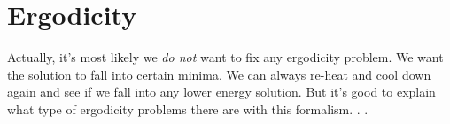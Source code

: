 \documentclass[11pt]{article}
\begin{document}
\section{Ergodicity}
Actually, it's most likely we \emph{do not} want to fix any ergodicity problem.  We want the solution to fall into certain minima.  We can always re-heat and cool down again and see if we fall into any lower energy solution.  But it's good to explain what type of ergodicity problems there are with this formalism. . .

%
\end{document}

